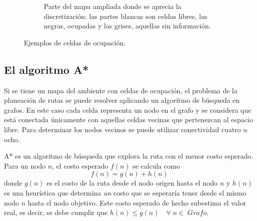 \documentclass[letterpaper,12pt]{article}
\begin{document}
\begin{figure}
\begin{subfigure}{0.4\textwidth}
    \caption{Parte del mapa ampliada donde se aprecia la discretización: las partes blancas son celdas libres, las negras, ocupadas y las grises, aquellas sin información.}
  \end{subfigure}
  \caption{Ejemplos de celdas de ocupación.}
  \label{fig:OccGrids}
\end{figure}

\subsection{El algoritmo A*}
\label{sec:AStar}
Si se tiene un mapa del ambiente con celdas de ocupación, el problema de la planeación de rutas se puede resolver aplicando un algoritmo de búsqueda en grafos. En este caso cada celda representa un nodo en el grafo y se considera que está conectada únicamente con aquellas celdas vecinas que pertenezcan al espacio libre. Para determinar los nodos vecinos se puede utilizar conectividad cuatro u ocho.

A* es un algoritmo de búsqueda que explora la ruta con el menor costo esperado. Para un nodo $n$, el costo esperado $f(n)$ se calcula como 
\[f(n) = g(n) + h(n)\]
donde $g(n)$ es el costo de la ruta desde el nodo origen hasta el nodo $n$ y $h(n)$ es una heurística que determina \textit{un} costo que se esperaría tener desde el mismo nodo $n$ hasta el nodo objetivo. Este costo esperado de hecho subestima el valor real, es decir, se debe cumplir que $h(n) \leq g(n)\quad \forall\; n \in\; Grafo$. 
\end{document}
